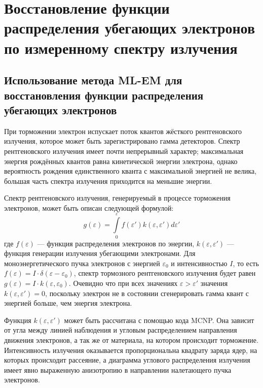 
\FloatBarrier
\section{ Восстановление функции распределения убегающих электронов по измеренному спектру излучения }

\subsection{ Использование метода ML-EM для восстановления функции распределения убегающих электронов }
\label{sec:runawayReconstructionMlem}

При торможении электрон испускает поток квантов жёсткого рентгеновского излучения, которое может быть зарегистрировано гамма детекторов. Спектр рентгеновского излучения имеет почти непрерывный характер; максимальная энергия рождённых квантов равна кинетической энергии электрона, однако вероятность рождения единственного кванта с максимальной энергией не велика, большая часть спектра излучения приходится на меньшие энергии.~\cite{Kuznetsov1974}

Спектр рентгеновского излучения, генерируемый в процессе торможения электронов, может быть описан следующей формулой:
\begin{equation}
  \label{eq:RunawayConvolution}
  g( \varepsilon ) = \int \limits_0^{ \varepsilon } f(\varepsilon') k( \varepsilon, \varepsilon' ) d \varepsilon'
\end{equation}
где $f(\varepsilon)$ --- функция распределения электронов по энергии, $k( \varepsilon, \varepsilon' )$ --- функция генерации излучения убегающими электронами. Для моноэнергетического пучка электронов с энергией $\varepsilon_0$ и интенсивностью $I$, то есть $ f(\varepsilon) = I \cdot \delta( \varepsilon - \varepsilon_0 ) $, спектр тормозного рентгеновского излучения будет равен $g(\varepsilon) = I \cdot k( \varepsilon, \varepsilon_0 )$. Очевидно что при всех значениях $\varepsilon > \varepsilon'$ значения $k( \varepsilon, \varepsilon' ) = 0$, поскольку электрон не в состоянии сгенерировать гамма квант с энергией больше, чем энергия электрона.~\cite{Shevelev2013} 

Функция $k( \varepsilon, \varepsilon' )$ может быть рассчитана с помощью кода MCNP. Она зависит от угла между линией наблюдения и угловым распределением направления движения электронов, а так же от материала, на котором происходит торможение. Интенсивность излучения оказывается пропорциональна квадрату заряда ядер, на которых происходит рассеяние, а диаграмма углового распределения излучения имеет явно выраженную анизотропию в направлении налетающего пучка электронов.~\cite{Shevelev2013}

